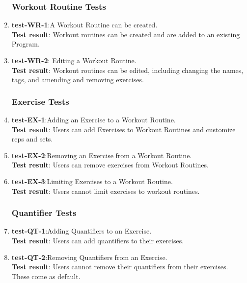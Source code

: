 \documentclass[12pt, titlepage]{article}
\begin{document}
\begin{enumerate}
   
\subsubsection{Workout Routine Tests}
    \item{\textbf{test-WR-1}}:A Workout Routine can be created.\\
    \textbf{Test result}: Workout routines can be created and are added to an existing Program.
   
    \item{\textbf{test-WR-2}}: Editing a Workout Routine.\\
    \textbf{Test result}: Workout routines can be edited, including changing the names, tags, and amending and removing exercises.
   
\subsubsection{Exercise Tests}
    \item{\textbf{test-EX-1}}:Adding an Exercise to a Workout Routine.\\
    \textbf{Test result}: Users can add Exercises to Workout Routines and customize reps and sets.
   
    \item{\textbf{test-EX-2}}:Removing an Exercise from a Workout Routine.\\
    \textbf{Test result}: Users can remove exercises from Workout Routines.
   
    \item{\textbf{test-EX-3}}:Limiting Exercises to a Workout Routine.\\
    \textbf{Test result}: Users cannot limit exercises to workout routines.
   
\subsubsection{Quantifier Tests}
    \item{\textbf{test-QT-1}}:Adding Quantifiers to an Exercise.\\
    \textbf{Test result}: Users can add quantifiers to their exercises.
   
    \item{\textbf{test-QT-2}}:Removing Quantifiers from an Exercise.\\
    \textbf{Test result}: Users cannot remove their quantifiers from their exercises. These come as default.
   

\end{enumerate}
\end{document}
